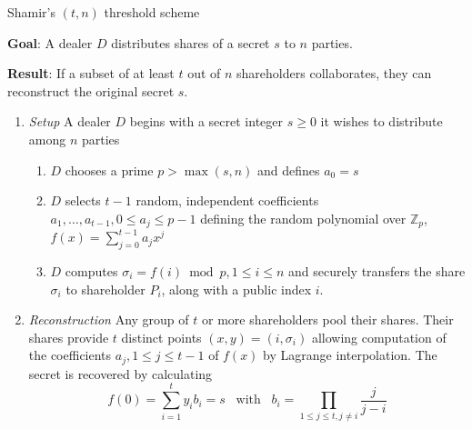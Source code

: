 \begin{algorithm}
\caption{Shamir's $\left( t, n \right)$ threshold scheme~\cite{book:handbook_of_applied_cryptography} }
\label{alg:shamirs_threshold_sheme}
\begin{description}
 \item \textbf{Goal}: A dealer $D$ distributes shares of a secret $s$ to $n$ parties.
 
 \item \textbf{Result}: If a subset of at least $t$ out of $n$ shareholders collaborates, they can reconstruct the original secret $s$.
\end{description}

 \begin{enumerate}
  \item \textit{Setup} A dealer $D$ begins with a secret integer $s \geq 0$ it wishes to distribute among $n$ parties
   \begin{enumerate}
    \item $D$ chooses a prime $p > \max \left( s, n \right)$ and defines $a_0 = s$
    \item $D$ selects $t-1$ random, independent coefficients $a_1, \ldots, a_{t-1}, 0 \leq a_j \leq p-1$ defining the random polynomial over $\mathbb{Z}_p$, $f \left( x \right) = \sum^{t-1}_{j=0} a_j x^j$
    \item $D$ computes $\sigma_i = f \left( i \right) \bmod p, 1 \leq i \leq n$ and securely transfers the share $\sigma_i$ to shareholder $P_i$, along with a public index $i$.
   \end{enumerate}
   \item \textit{Reconstruction} Any group of $t$ or more shareholders pool their shares. Their shares provide $t$ distinct points $\left( x, y \right) = \left( i, \sigma_i \right)$ allowing computation of the coefficients $a_j, 1 \leq j \leq t-1$ of $f \left( x \right)$ by Lagrange interpolation. The secret is recovered by calculating
 \begin{equation*}
  f \left( 0 \right) = \sum^t_{i=1}y_i b_i = s \; \; \; \textrm{with} \; \; \; b_i = \prod_{1 \leq j \leq t, j \neq i} \frac{j}{j-i}
 \end{equation*}
 \end{enumerate}
\end{algorithm}

